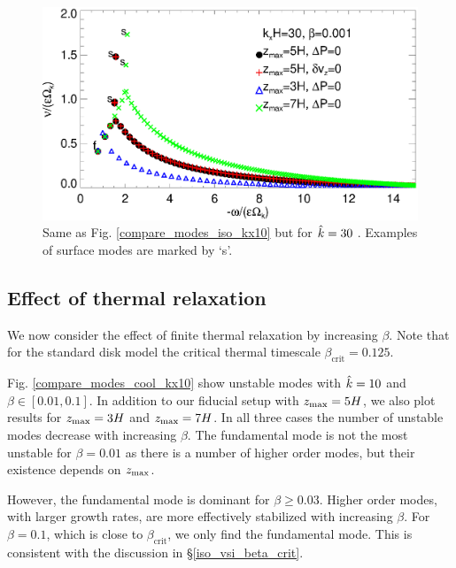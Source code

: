 \begin{figure}
  \includegraphics[width=\linewidth]{figures/compare_modes_iso_kx30_tags.ps}
  \caption{Same as Fig. \ref{compare_modes_iso_kx10} but for $\hat{k}=30$
    \label{compare_modes_iso_kx30}. Examples of surface modes are
    marked by `s'. 
  }
\end{figure}


\subsection{Effect of thermal relaxation}\label{therm_relax_eff}
We now consider the effect of finite thermal relaxation by increasing 
$\beta$. Note that for the standard disk model the critical thermal 
timescale $\beta_\mathrm{crit} = 0.125$.  

Fig. \ref{compare_modes_cool_kx10} show unstable modes with $\hat{k}=10$ 
and $\beta\in[0.01,0.1]$. In addition to our fiducial setup with 
$z_\mathrm{max}=5H$, we also plot results for $z_\mathrm{max}=3H$ and $z_\mathrm{max}=7H$. In all 
three cases the number of unstable modes decrease with increasing
$\beta$. The fundamental mode is not the most unstable for 
$\beta=0.01$ as there is a number of higher order modes, but 
their existence depends on $z_\mathrm{max}$. 

However, the fundamental mode is dominant for $\beta \geq 
0.03$. Higher order modes, with larger growth rates, are more
effectively stabilized with increasing $\beta$. For $\beta=0.1$, which
is close to $\beta_\mathrm{crit}$, we only find the fundamental
mode. This is consistent with the discussion in 
\S\ref{iso_vsi_beta_crit}.   

